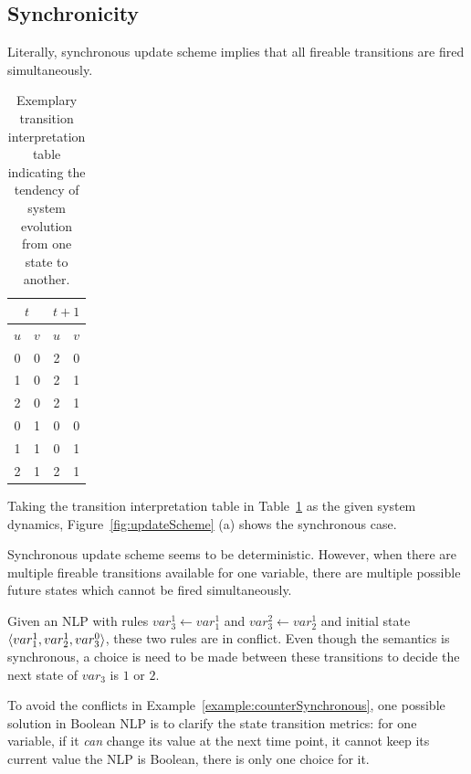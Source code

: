 \subsection{Synchronicity}
Literally, synchronous update scheme implies that all fireable transitions are fired simultaneously.

\begin{table}[ht]
    \centering
    \begin{tabular}{cc|cc}
        \multicolumn{2}{c|}{$t$}&\multicolumn{2}{c}{$t+1$}\\
        \hline
        $u$ & $v$ & $u$ & $v$ \\
        \hline
        0 & 0 & 2 & 0 \\
        1 & 0 & 2 & 1 \\
        2 & 0 & 2 & 1 \\
        0 & 1 & 0 & 0 \\
        1 & 1 & 0 & 1 \\
        2 & 1 & 2 & 1 \\
    \end{tabular}
    \caption{Exemplary transition interpretation table indicating the tendency of system evolution from one state to another.}
    \label{tab:transTable}
\end{table}


\begin{example}
Taking the transition interpretation table in Table~\ref{tab:transTable} as the given system dynamics, Figure~\ref{fig:updateScheme} (a) shows the synchronous case. 
\end{example}


Synchronous update scheme seems to be deterministic. 
However, when there are multiple fireable transitions available for one variable, there are multiple possible future states which cannot be fired simultaneously. 

\begin{example}\label{example:counterSynchronous}
Given an NLP with rules $var_3^1\gets var_1^1$ and $var_3^2 \gets var_2^1$
and initial state $\langle var_1^1, var_2^1, var_3^0\rangle$,
these two rules are in conflict.
Even though the semantics is synchronous, a choice is need to be made between these transitions to decide the next state of $var_3$ is $1$ or $2$.
\end{example}

To avoid the conflicts in Example~\ref{example:counterSynchronous}, one possible solution in Boolean NLP is to clarify the state transition metrics:
for one variable, if it \textit{can} change its value at the next time point, it cannot keep its current value the NLP is Boolean, there is only one choice for it.

